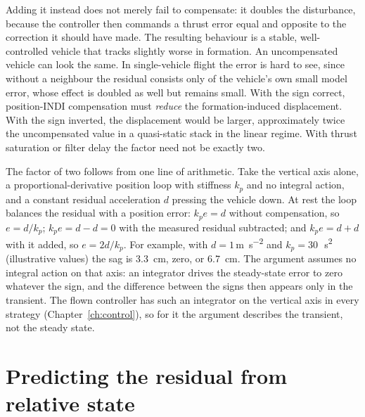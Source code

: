 Adding it instead does not merely fail to compensate: it doubles the disturbance, because the
controller then commands a thrust error equal and opposite to the correction it should have made.
The resulting behaviour is a stable, well-controlled vehicle that tracks slightly worse in
formation. An uncompensated vehicle can look the same. In single-vehicle flight the error is
hard to see, since without a neighbour the residual consists only of the vehicle's own small model
error, whose effect is doubled as well but remains small. With the sign
correct, position-INDI compensation must \emph{reduce} the formation-induced displacement. With
the sign inverted, the displacement would be larger, approximately twice the uncompensated value
in a quasi-static stack in the linear regime. With thrust saturation or filter delay the factor
need not be exactly two.

The factor of two follows from one line of arithmetic. Take the vertical axis alone, a
proportional-derivative position loop with stiffness $k_p$ and no integral action, and a constant
residual acceleration $d$ pressing the vehicle down. At rest the loop balances the residual with a
position error: $k_p e = d$ without compensation, so $e = d/k_p$; $k_p e = d - d = 0$ with the
measured residual subtracted; and $k_p e = d + d$ with it added, so $e = 2d/k_p$. For example, with
$d = 1$\,\si{\metre\per\second\squared} and $k_p = 30$\,\si{\per\second\squared} (illustrative
values) the sag is \SI{3.3}{\centi\metre}, zero, or \SI{6.7}{\centi\metre}. The argument assumes
no integral action on that axis: an integrator drives the steady-state error to zero whatever the
sign, and the difference between the signs then appears only in the transient. The flown controller
has such an integrator on the vertical axis in every strategy (Chapter~\ref{ch:control}), so for it
the argument describes the transient, not the steady state.

\section{Predicting the residual from relative state}
\label{sec:model-deepsets}

